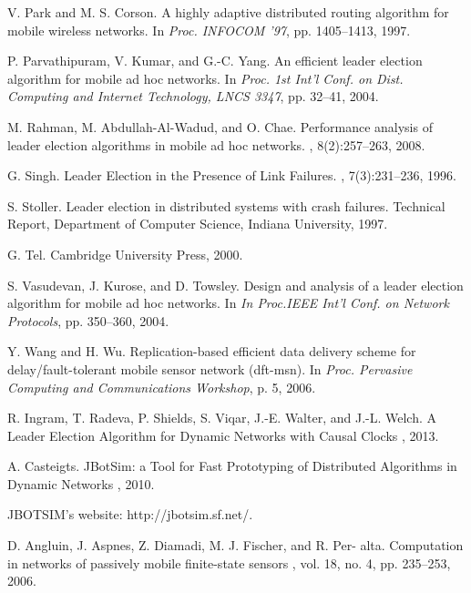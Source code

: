 \begin{thebibliography}{1}
	V. Park and M. S. Corson.
	\newblock A highly adaptive distributed routing algorithm for mobile wireless networks.
	\newblock In {\em Proc. INFOCOM ’97}, pp. 1405–1413, 1997.
	
	P. Parvathipuram, V. Kumar, and G.-C. Yang.
	\newblock An efficient leader election algorithm for mobile ad hoc networks.
	\newblock In {\em Proc. 1st Int’l Conf. on Dist. Computing and Internet Technology, LNCS 3347}, pp. 32–41, 2004.
	
	M. Rahman, M. Abdullah-Al-Wadud, and O. Chae.
	\newblock Performance analysis of leader election algorithms in mobile ad hoc networks.
	, 8(2):257–263, 2008.
	
	G. Singh.
	\newblock Leader Election in the Presence of Link Failures.
	, 7(3):231–236, 1996.
	
	S. Stoller.
	\newblock Leader election in distributed systems with crash failures.
	\newblock Technical Report, Department of Computer Science, Indiana University, 1997.
	
	G. Tel.
	\newblock Cambridge University Press, 2000.
	
	S. Vasudevan, J. Kurose, and D. Towsley.
	\newblock Design and analysis of a leader election algorithm for mobile ad hoc networks.
	\newblock In {\em In Proc.IEEE Int’l Conf. on Network Protocols}, pp. 350–360, 2004.
	
	Y. Wang and H. Wu.
	\newblock Replication-based efficient data delivery scheme for delay/fault-tolerant mobile sensor network (dft-msn).
	\newblock In {\em Proc. Pervasive Computing and Communications Workshop}, p. 5, 2006.
	
	R. Ingram, T. Radeva, P. Shields, S. Viqar, J.-E. Walter, and J.-L. Welch.
	\newblock A Leader Election Algorithm for Dynamic Networks with Causal Clocks
	\newblock , 2013.
	
	A. Casteigts.
	\newblock JBotSim: a Tool for Fast Prototyping of Distributed Algorithms in Dynamic Networks
	\newblock , 2010.
	
	JBOTSIM’s website: http://jbotsim.sf.net/.
	
	
	D. Angluin, J. Aspnes, Z. Diamadi, M. J. Fischer, and R. Per- alta.
	\newblock Computation in networks of passively mobile finite-state sensors
	\newblock, vol. 18, no. 4, pp. 235–253, 2006.
	

\end{thebibliography}
